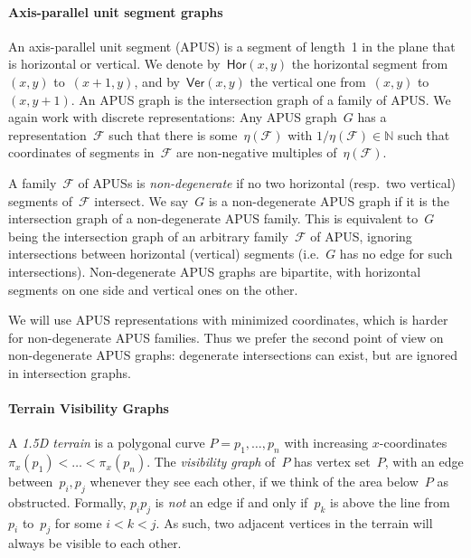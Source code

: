 \documentclass[a4paper,UKenglish,cleveref,thm-restate]{lipics-v2021}
\theoremstyle{remark}
\newcommand{\Fc}{\mathcal{F}}
\newcommand{\N}{\mathbb{N}}
\newcommand{\Vseg}{\mathsf{Ver}}
\newcommand{\Hseg}{\mathsf{Hor}}
\newcommand{\Xco}{\pi_x}
\begin{document}
\paragraph*{Axis-parallel unit segment graphs}
An axis-parallel unit segment (APUS) is a segment of length~1 in the plane that is horizontal or vertical.
We denote by~$\Hseg(x,y)$ the horizontal segment from~$(x,y)$ to~$(x+1,y)$,
and by~$\Vseg(x,y)$ the vertical one from~$(x,y)$ to~$(x,y+1)$.
An APUS graph is the intersection graph of a family of APUS.
We again work with discrete representations:
Any APUS graph~$G$ has a representation~$\Fc$ such that there is some~$\eta(\Fc)$ with $1/\eta(\Fc) \in \N$ such that coordinates of segments in~$\Fc$ are non-negative multiples of~$\eta(\Fc)$.

A family~$\Fc$ of APUSs is \emph{non-degenerate} if no two horizontal (resp.\ two vertical) segments of~$\Fc$ intersect.
We say~$G$ is a non-degenerate APUS graph if it is the intersection graph of a non-degenerate APUS family.
This is equivalent to~$G$ being the intersection graph of an arbitrary family~$\Fc$ of APUS, ignoring intersections between horizontal (vertical) segments (i.e.~$G$ has no edge for such intersections).
Non-degenerate APUS graphs are bipartite, with horizontal segments on one side and vertical ones on the other.

We will use APUS representations with minimized coordinates, which is harder for non-degenerate APUS families.
Thus we prefer the second point of view on non-degenerate APUS graphs:
degenerate intersections can exist, but are ignored in intersection graphs.

\paragraph*{Terrain Visibility Graphs}
A \emph{1.5D terrain} is a polygonal curve $P = p_1,\dots,p_n$ with increasing $x$-coordinates $\Xco(p_1) < \dots < \Xco(p_n)$.
The \emph{visibility graph} of~$P$ has vertex set~$P$, with an edge between~$p_i,p_j$ whenever they see each other,
if we think of the area below~$P$ as obstructed.
Formally, $p_ip_j$ is \emph{not} an edge if and only if~$p_k$ is above the line from~$p_i$ to~$p_j$ for some $i<k<j$.
As such, two adjacent vertices in the terrain will always be visible to each other.
\end{document}
